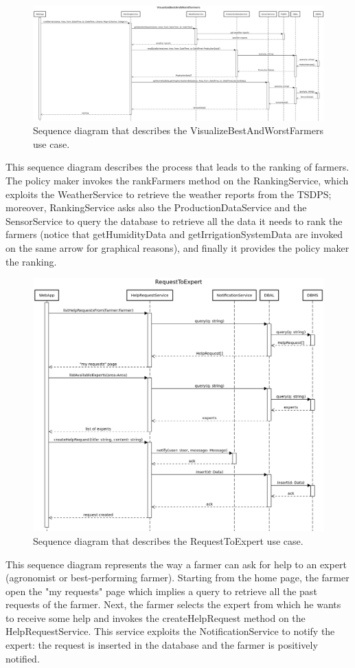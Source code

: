 \documentclass{article}
\begin{document}
\newpage
\begin{figure}[H]
   \centering
   \includegraphics[scale=0.20]{diagrams/sequence diagrams/VisualizeBestAndWorstFarmers.png}
    \caption{Sequence diagram that describes the VisualizeBestAndWorstFarmers use case.}
\end{figure}
This sequence diagram describes the process that leads to the ranking of farmers. The policy maker invokes the rankFarmers method on the RankingService, which exploits the WeatherService to retrieve the weather reports from the TSDPS; moreover, RankingService asks also the ProductionDataService and the SensorService to query the database to retrieve all the data it needs to rank the farmers (notice that getHumidityData and getIrrigationSystemData are invoked on the same arrow for graphical reasons), and finally it provides the policy maker the ranking.

\newpage
\begin{figure}[H]
   \centering
   \includegraphics[scale=0.40]{diagrams/sequence diagrams/RequestToExpert.png}
    \caption{Sequence diagram that describes the RequestToExpert use case.}
\end{figure}
This sequence diagram represents the way a farmer can ask for help to an expert (agronomist or best-performing farmer). Starting from the home page, the farmer open the "my requests" page which implies a query to retrieve all the past requests of the farmer. Next, the farmer selects the expert from which he wants to receive some help and invokes the createHelpRequest method on the HelpRequestService. This service exploits the NotificationService to notify the expert: the request is inserted in the database and the farmer is positively notified.
\end{document}
